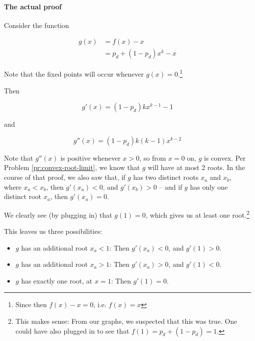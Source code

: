 \paragraph{The actual proof}


Consider the function

\begin{align*}
g(x) &= f(x) - x \\
&= p_d + (1 - p_d)x^k - x
\end{align*}

Note that the fixed points will occur whenever $g(x) = 0$.\footnote{Since then $f(x) - x = 0$, i.e. $f(x) = x$}

Then

\begin{equation}
g'(x) = (1 - p_d)kx^{k-1} - 1
\end{equation}

and

\begin{equation}
g''(x) = (1 - p_d)k(k-1)x^{k-2}
\end{equation}

Note that $g''(x)$ is positive whenever $x > 0$, so from $x = 0$ on, $g$ is convex. Per Problem \ref{pr:convex-root-limit}, we know that $g$ will have at most 2 roots. In the course of that proof, we also saw that, if $g$ has two distinct roots $x_a$ and $x_b$, where $x_a < x_b$, then $g'(x_a) < 0$, and $g'(x_b) > 0$ -- and if $g$ has only one distinct root $x_a$, then $g'(x_a) = 0$. %

We clearly see (by plugging in) that $g(1) = 0$, which gives us at least one root.\footnote{This makes sense: From our graphs, we suspected that this was true. One could have also plugged in to see that $f(1) = p_d + (1 - p_d) = 1$.}

This leaves us three possibilities:

\begin{itemize}
\item $g$ has an additional root $x_a < 1$: Then $g'(x_a) < 0$, and $g'(1) > 0$.
\item $g$ has an additional root $x_a > 1$: Then $g'(x_a) > 0$, and $g'(1) < 0$.
\item $g$ has exactly one root, at $x = 1$: Then $g'(1) = 0$.
\end{itemize}

